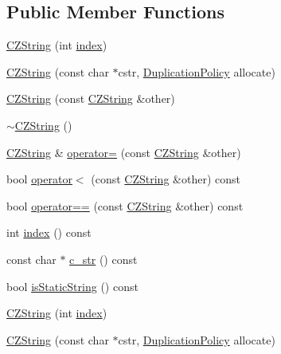 \subsection*{Public Member Functions}
\begin{DoxyCompactItemize}
\item 
\hyperlink{classJson_1_1Value_1_1CZString_add39471aa88312bd2da04b45a3e69631}{C\-Z\-String} (int \hyperlink{classJson_1_1Value_1_1CZString_aa4c7e02fa4c8e590e9b5ff4fb90de5a4}{index})
\item 
\hyperlink{classJson_1_1Value_1_1CZString_a8b1f1afc46eb28e099ff39d20ae7fb79}{C\-Z\-String} (const char $\ast$cstr, \hyperlink{classJson_1_1Value_1_1CZString_a2805c46fb4a72bbaed55de6d75941b6d}{Duplication\-Policy} allocate)
\item 
\hyperlink{classJson_1_1Value_1_1CZString_a4e3e7c07855ecf7a20417dedd6790947}{C\-Z\-String} (const \hyperlink{classJson_1_1Value_1_1CZString}{C\-Z\-String} \&other)
\item 
\hyperlink{classJson_1_1Value_1_1CZString_add6989dc7073646b95e5ebacb3f07d51}{$\sim$\-C\-Z\-String} ()
\item 
\hyperlink{classJson_1_1Value_1_1CZString}{C\-Z\-String} \& \hyperlink{classJson_1_1Value_1_1CZString_a06925d591132ed7f2e128bdfd62424fc}{operator=} (const \hyperlink{classJson_1_1Value_1_1CZString}{C\-Z\-String} \&other)
\item 
bool \hyperlink{classJson_1_1Value_1_1CZString_a1fdef0752c6ffe3cd61f227f869d2735}{operator$<$} (const \hyperlink{classJson_1_1Value_1_1CZString}{C\-Z\-String} \&other) const 
\item 
bool \hyperlink{classJson_1_1Value_1_1CZString_a69bb79f479d2b67966549107a94e46d2}{operator==} (const \hyperlink{classJson_1_1Value_1_1CZString}{C\-Z\-String} \&other) const 
\item 
int \hyperlink{classJson_1_1Value_1_1CZString_aa4c7e02fa4c8e590e9b5ff4fb90de5a4}{index} () const 
\item 
const char $\ast$ \hyperlink{classJson_1_1Value_1_1CZString_ab2f97c5688e28d8a9e3e5ca16bf3b324}{c\-\_\-str} () const 
\item 
bool \hyperlink{classJson_1_1Value_1_1CZString_af3cc02b77c2cd79d4646fcea3575c1fd}{is\-Static\-String} () const 
\item 
\hyperlink{classJson_1_1Value_1_1CZString_add39471aa88312bd2da04b45a3e69631}{C\-Z\-String} (int \hyperlink{classJson_1_1Value_1_1CZString_aa4c7e02fa4c8e590e9b5ff4fb90de5a4}{index})
\item 
\hyperlink{classJson_1_1Value_1_1CZString_a8b1f1afc46eb28e099ff39d20ae7fb79}{C\-Z\-String} (const char $\ast$cstr, \hyperlink{classJson_1_1Value_1_1CZString_a2805c46fb4a72bbaed55de6d75941b6d}{Duplication\-Policy} allocate)

\end{DoxyCompactItemize}

